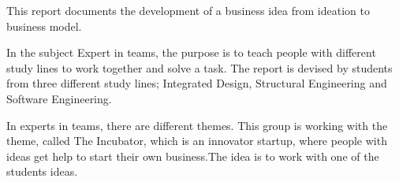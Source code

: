 This report documents the development of a business idea from ideation to business model.

In the subject Expert in teams, the purpose is to teach people with different study lines to work together and solve a task. The report is devised by students from three different study lines; Integrated Design, Structural Engineering and Software Engineering.

In experts in teams, there are different themes.
This group is working with the theme, called The Incubator, which is an innovator startup, where people with ideas get help to start their own business.The idea is to work with one of the students ideas.